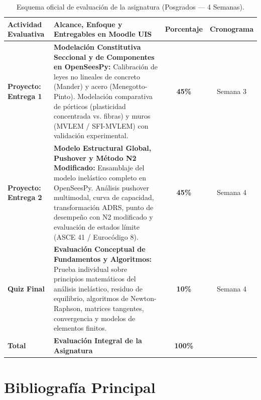 \documentclass[11pt,letterpaper]{article}
\begin{document}
\begin{table}[H]
\centering
\caption{Esquema oficial de evaluación de la asignatura (Posgrados --- 4 Semanas).}
\label{tab:evaluacion_sintetica}
\small
\setlength{\tabcolsep}{4.5pt}
\renewcommand{\arraystretch}{1.15}
\begin{tabularx}{\textwidth}{l X c c}
\toprule
\textbf{Actividad Evaluativa} & \textbf{Alcance, Enfoque y Entregables en Moodle UIS} & \textbf{Porcentaje} & \textbf{Cronograma} \\
\midrule
\textbf{Proyecto: Entrega 1} & 
\textbf{Modelación Constitutiva Seccional y de Componentes en OpenSeesPy:} \newline
Calibración de leyes no lineales de concreto (Mander) y acero (Menegotto-Pinto). Modelación comparativa de pórticos (plasticidad concentrada vs. fibras) y muros (MVLEM / SFI-MVLEM) con validación experimental. & 
\textbf{45\%} & Semana 3 \\
\midrule
\textbf{Proyecto: Entrega 2} & 
\textbf{Modelo Estructural Global, Pushover y Método N2 Modificado:} \newline
Ensamblaje del modelo inelástico completo en OpenSeesPy. Análisis pushover multimodal, curva de capacidad, transformación ADRS, punto de desempeño con N2 modificado y evaluación de estados límite (ASCE 41 / Eurocódigo 8). & 
\textbf{45\%} & Semana 4 \\
\midrule
\textbf{Quiz Final} & 
\textbf{Evaluación Conceptual de Fundamentos y Algoritmos:} \newline
Prueba individual sobre principios matemáticos del análisis inelástico, residuo de equilibrio, algoritmos de Newton-Raphson, matrices tangentes, convergencia y modelos de elementos finitos. & 
\textbf{10\%} & Semana 4 \\
\midrule
\textbf{Total} & \textbf{Evaluación Integral de la Asignatura} & \textbf{100\%} & \\
\bottomrule
\end{tabularx}
\end{table}

\vspace{0.05cm}

\section{Bibliografía Principal}
\end{document}

